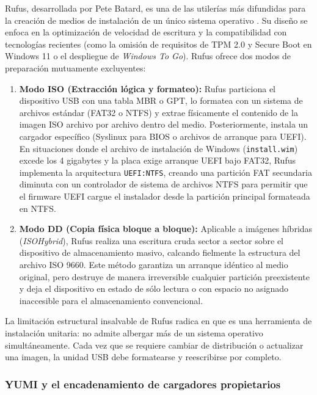 \documentclass[12pt]{article}
\begin{document}
Rufus, desarrollada por Pete Batard, es una de las utilerías más difundidas para la creación de medios de instalación de un único sistema operativo \parencite{batard2024rufus}. Su diseño se enfoca en la optimización de velocidad de escritura y la compatibilidad con tecnologías recientes (como la omisión de requisitos de TPM 2.0 y Secure Boot en Windows 11 o el despliegue de \textit{Windows To Go}). Rufus ofrece dos modos de preparación mutuamente excluyentes:
\begin{enumerate}[noitemsep, topsep=2pt]
    \item \textbf{Modo ISO (Extracción lógica y formateo):} Rufus particiona el dispositivo USB con una tabla MBR o GPT, lo formatea con un sistema de archivos estándar (FAT32 o NTFS) y extrae físicamente el contenido de la imagen ISO archivo por archivo dentro del medio. Posteriormente, instala un cargador específico (Syslinux para BIOS o archivos de arranque para UEFI). En situaciones donde el archivo de instalación de Windows (\texttt{install.wim}) excede los 4 gigabytes y la placa exige arranque UEFI bajo FAT32, Rufus implementa la arquitectura \texttt{UEFI:NTFS}, creando una partición FAT secundaria diminuta con un controlador de sistema de archivos NTFS para permitir que el firmware UEFI cargue el instalador desde la partición principal formateada en NTFS.
    \item \textbf{Modo DD (Copia física bloque a bloque):} Aplicable a imágenes híbridas (\textit{ISOHybrid}), Rufus realiza una escritura cruda sector a sector sobre el dispositivo de almacenamiento masivo, calcando fielmente la estructura del archivo ISO 9660. Este método garantiza un arranque idéntico al medio original, pero destruye de manera irreversible cualquier partición preexistente y deja el dispositivo en estado de sólo lectura o con espacio no asignado inaccesible para el almacenamiento convencional.
\end{enumerate}

La limitación estructural insalvable de Rufus radica en que es una herramienta de instalación unitaria: no admite albergar más de un sistema operativo simultáneamente. Cada vez que se requiere cambiar de distribución o actualizar una imagen, la unidad USB debe formatearse y reescribirse por completo.

\subsubsection{YUMI y el encadenamiento de cargadores propietarios}
\end{document}
